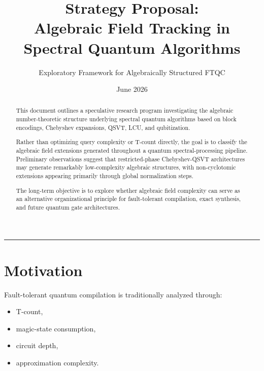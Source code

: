 \documentclass[12pt,a4paper]{article}
\begin{document}
\title{
\textbf{
Strategy Proposal:\\
Algebraic Field Tracking in Spectral Quantum Algorithms
}
}

\author{
Exploratory Framework for Algebraically Structured FTQC
}

\date{June 2026}

\maketitle

\begin{abstract}
This document outlines a speculative research program investigating the algebraic number-theoretic structure underlying spectral quantum algorithms based on block encodings, Chebyshev expansions, QSVT, LCU, and qubitization. 

Rather than optimizing query complexity or T-count directly, the goal is to classify the algebraic field extensions generated throughout a quantum spectral-processing pipeline. Preliminary observations suggest that restricted-phase Chebyshev-QSVT architectures may generate remarkably low-complexity algebraic structures, with non-cyclotomic extensions appearing primarily through global normalization steps.

The long-term objective is to explore whether algebraic field complexity can serve as an alternative organizational principle for fault-tolerant compilation, exact synthesis, and future quantum gate architectures.
\end{abstract}

\tableofcontents

\vspace{1em}
\hrule
\vspace{1em}


\section{Motivation}

Fault-tolerant quantum compilation is traditionally analyzed through:

\begin{itemize}
    \item T-count,
    \item magic-state consumption,
    \item circuit depth,
    \item approximation complexity.
\end{itemize}
\end{document}
